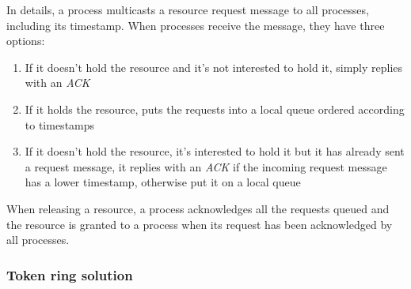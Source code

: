 In details, a process multicasts a resource request message to all processes, including its timestamp. When processes receive the message, they have three options:
\begin{enumerate}
    \item If it doesn't hold the resource and it's not interested to hold it, simply replies with an \textit{ACK}
    \item If it holds the resource, puts the requests into a local queue ordered according to timestamps
    \item If it doesn't hold the resource, it's interested to hold it but it has already sent a request message, it replies with an \textit{ACK} if the incoming request message has a lower timestamp, otherwise put it on a local queue
\end{enumerate}
When releasing a resource, a process acknowledges all the requests queued and the resource is granted to a process when its request has been acknowledged by all processes.

\subsubsection{Token ring solution}
